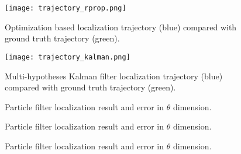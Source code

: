 \begin{figure}[!htbp]
\begin{center}
	\texttt{[image: trajectory\_rprop.png]}
\end{center}
\caption[Optimization based localization trajectory compared with ground truth trajectory.]{Optimization based localization trajectory (blue) compared with ground truth trajectory (green).}
\label{fig:benchmarkRprop}
\end{figure}


\begin{figure}[!htbp]
\begin{center}
	\texttt{[image: trajectory\_kalman.png]}
\end{center}
\caption[Multi-hypotheses Kalman filter localization trajectory compared with ground truth trajectory.]{Multi-hypotheses Kalman filter localization trajectory (blue) compared with ground truth trajectory (green).}
\label{fig:benchmarkKalman}
\end{figure}
 



\begin{figure}[!htbp]
  \centering
    \begin{subfigure}[b]{0.9\textwidth}
      
    \end{subfigure}
    \begin{subfigure}[b]{0.9\textwidth}
      
    \end{subfigure}
  \caption{Particle filter localization result and error in $\theta$ dimension.}
 \label{fig:benchmarkParticle0}
\end{figure}

\begin{figure}[!htbp]
  \centering
    \begin{subfigure}[b]{0.9\textwidth}
      
    \end{subfigure}
    \begin{subfigure}[b]{0.9\textwidth}
      
    \end{subfigure}
  \caption{Particle filter localization result and error in $\theta$ dimension.}
 \label{fig:benchmarkParticle1}
\end{figure}

\begin{figure}[!htbp]
  \centering
    \begin{subfigure}[b]{0.9\textwidth}
      
    \end{subfigure}
    \begin{subfigure}[b]{0.9\textwidth}
      
    \end{subfigure}
  \caption{Particle filter localization result and error in $\theta$ dimension.}
 \label{fig:benchmarkParticle2}
\end{figure}


